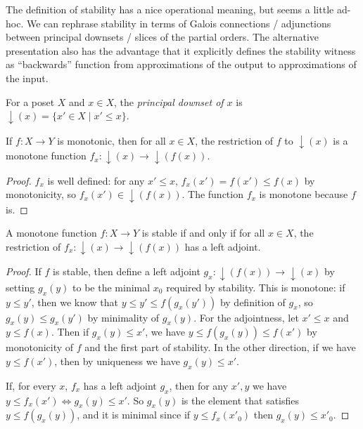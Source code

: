 The definition of stability has a nice operational meaning, but seems
a little ad-hoc. We can rephrase stability in terms of Galois
connections / adjunctions between principal downsets / slices of the
partial orders. The alternative presentation also has the advantage
that it explicitly defines the stability witness as ``backwards''
function from approximations of the output to approximations of the
input.

\newcommand{\downset}[1]{\mathop{\downarrow}(#1)}

\begin{definition}
  For a poset $X$ and $x \in X$, the \emph{principal
    downset of $x$} is $\downset{x} = \{ x' \in X \mid x' \leq x \}$.
\end{definition}

\begin{lemma}
  If $f : X \to Y$ is monotonic, then for all $x \in X$, the
  restriction of $f$ to $\downset{x}$ is a monotone function
  $f_x : \downset{x} \to \downset{f(x)}$.
\end{lemma}

\begin{proof}
  $f_x$ is well defined: for any $x' \leq x$,
  $f_x(x') = f(x') \leq f(x)$ by monotonicity, so
  $f_x(x') \in \downset{f(x)}$. The function $f_x$ is monotone because
  $f$ is.
\end{proof}

\begin{lemma}
  A monotone function $f : X \to Y$ is stable if and only if for all
  $x \in X$, the restriction of $f_x : \downset{x} \to \downset{f(x)}$
  has a left adjoint.
\end{lemma}

\begin{proof}
  If $f$ is stable, then define a left adjoint
  $g_x : \downset{f(x)} \to \downset{x}$ by setting $g_x(y)$ to be the
  minimal $x_0$ required by stability. This is monotone: if
  $y \leq y'$, then we know that $y \leq y' \leq f(g_x(y'))$ by
  definition of $g_x$, so $g_x(y) \leq g_x(y')$ by minimality of
  $g_x(y)$. For the adjointness, let $x' \leq x$ and $y \leq
  f(x)$. Then if $g_x(y) \leq x'$, we have
  $y \leq f(g_x(y)) \leq f(x')$ by monotonicity of $f$ and the first
  part of stability. In the other direction, if we have
  $y \leq f(x')$, then by uniqueness we have $g_x(y) \leq x'$.

  If, for every $x$, $f_x$ has a left adjoint $g_x$, then for any
  $x', y$ we have $y \leq f_x(x') \Leftrightarrow g_x(y) \leq x'$. So
  $g_x(y)$ is the element that satisfies $y \leq f(g_x(y))$, and it is
  minimal since if $y \leq f_x(x'_0)$ then $g_x(y) \leq x'_0$.
\end{proof}

